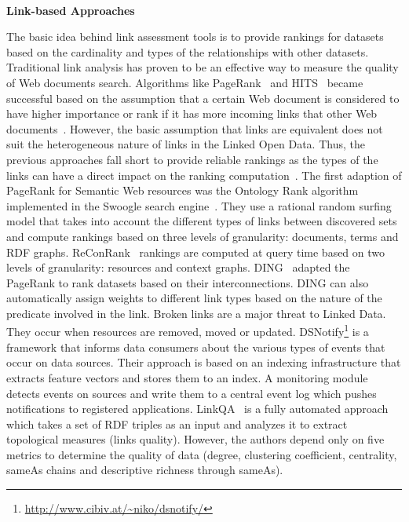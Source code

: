 \documentclass[onecolumn, crcready]{../../Util/LaTEX/iosart2c}
\begin{document}
\indent \\{\bf Link-based Approaches}

The basic idea behind link assessment tools is to provide rankings for datasets based on the cardinality and types of the relationships with other datasets. Traditional link analysis has proven to be an effective way to measure the quality of Web documents search. Algorithms like PageRank~\cite{Page:TechReport:98} and HITS~\cite{Kleinberg:ACM:99} became successful based on the assumption that a certain Web document is considered to have higher importance or rank if it has more incoming links that other Web documents~\cite{Brin:WWW:98}\cite{Chakrabarti:IEEE:99}. However, the basic assumption that links are equivalent does not suit the heterogeneous nature of links in the Linked Open Data. Thus, the previous approaches fall short to provide reliable rankings as the types of the links can have a direct impact on the ranking computation~\cite{Toupikov:LDOW:09}. The first adaption of PageRank for Semantic Web resources was the Ontology Rank algorithm implemented in the Swoogle search engine~\cite{Ding:CIKM:04}. They use a rational random surfing model that takes into account the different types of links between discovered sets and compute rankings based on three levels of granularity: documents, terms and RDF graphs. ReConRank~\cite{Hogan:SSKB:06} rankings are computed at query time based on two levels of granularity: resources and context graphs. DING~\cite{Toupikov:LDOW:09} adapted the PageRank to rank datasets based on their interconnections. DING can also automatically assign weights to different link types based on the nature of the predicate involved in the link. Broken links are a major threat to Linked Data. They occur when resources are removed, moved or updated. DSNotify\footnote{\url{http://www.cibiv.at/~niko/dsnotify/}}\cite{Haslhofer:IWS:09} is a framework that informs data consumers about the various types of events that occur on data sources. Their approach is based on an indexing infrastructure that extracts feature vectors and stores them to an index. A monitoring module detects events on sources and write them to a central event log which pushes notifications to registered applications. LinkQA~\cite{Gueret:ESWC:12} is a fully automated approach which takes a set of RDF triples as an input and analyzes it to extract topological measures (links quality). However, the authors depend only on five metrics to determine the quality of data (degree, clustering coefficient, centrality, sameAs chains and descriptive richness through sameAs).
\end{document}
